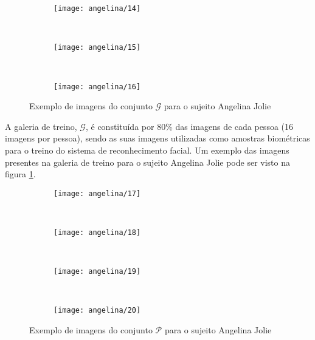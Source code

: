 \begin{figure}
\begin{subfigure}[b]{0.2\textwidth}
                \centering
                \texttt{[image: angelina/14]}
        \end{subfigure}
        ~
        \begin{subfigure}[b]{0.2\textwidth}
                \centering
                \texttt{[image: angelina/15]}
        \end{subfigure}%
        ~ %
        \begin{subfigure}[b]{0.2\textwidth}
                \centering
                \texttt{[image: angelina/16]}
        \end{subfigure}
        \caption{Exemplo de imagens do conjunto $\mathscr{G}$ para o sujeito Angelina Jolie}
        \label{fig:galeria}        
\end{figure}

A galeria de treino, $\mathscr{G}$, é constituída por 80\% das imagens de cada pessoa (16 imagens por pessoa), sendo as suas imagens utilizadas como amostras biométricas para o treino do sistema de reconhecimento facial. Um exemplo das imagens presentes na galeria de treino para o sujeito Angelina Jolie pode ser visto na figura \ref{fig:galeria}.

\begin{figure}
        \centering
        \begin{subfigure}[b]{0.2\textwidth}
                \centering
                \texttt{[image: angelina/17]}
        \end{subfigure}%
        ~ %
        \begin{subfigure}[b]{0.2\textwidth}
                \centering
                \texttt{[image: angelina/18]}
        \end{subfigure}
        ~
        \begin{subfigure}[b]{0.2\textwidth}
                \centering
                \texttt{[image: angelina/19]}
        \end{subfigure}%
        ~ %
        \begin{subfigure}[b]{0.2\textwidth}
                \centering
                \texttt{[image: angelina/20]}
        \end{subfigure}
        \caption{Exemplo de imagens do conjunto $\mathscr{P}$ para o sujeito Angelina Jolie}
        \label{fig:provas}   
\end{figure}

